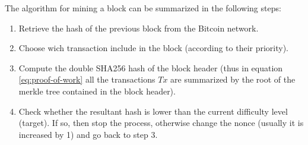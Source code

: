 The algorithm for mining a block can be summarized in the following steps:
\begin{enumerate}
  \item Retrieve the hash of the previous block from the Bitcoin network.
  \item Choose wich transaction include in the block (according to their priority).
  \item Compute the double SHA256 hash of the block header (thus in equation
  \ref{eq:proof-of-work} all the transactions $Tx$ are summarized by the root
  of the merkle tree contained in the block header).
  \item Check whether the resultant hash is lower than the current difficulty level
  (target). If so, then stop the process, otherwise change the nonce (usually it is
  increased by 1) and go back to step 3.
\end{enumerate}















